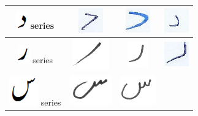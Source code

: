 \begin{table}[h]
\begin{tabular}{@{}cccc@{}}
\hline
\includegraphics[scale=0.25]{daal_orig.png} series & \includegraphics[scale=0.15]{Daal_2.png} & \includegraphics[scale=0.15]{Daal_3.png}  & \includegraphics[scale=0.15]{Daal_4.png} \\
\hline
\includegraphics[scale=0.25]{re_orig.png} series & \includegraphics[scale=0.15]{raay.PNG} & \includegraphics[scale=0.15]{raay2.PNG}  & \includegraphics[scale=0.15]{re_1.png} \\
\hline
\includegraphics[scale=0.25]{seen_orig.png} series & \includegraphics[scale=0.15]{seen.PNG} & \includegraphics[scale=0.15]{seen2.PNG}  &  \\
\hline

\end{tabular}
\end{table}
